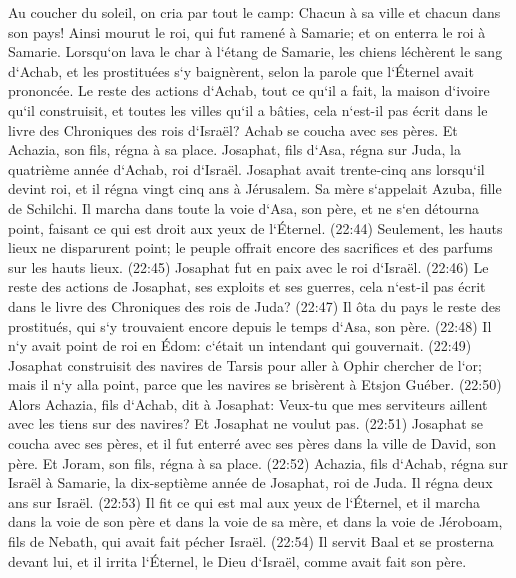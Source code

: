 \verse Au coucher du soleil, on cria par tout le camp: Chacun à sa ville et chacun dans son pays! 
\verse Ainsi mourut le roi, qui fut ramené à Samarie; et on enterra le roi à Samarie. 
\verse Lorsqu`on lava le char à l`étang de Samarie, les chiens léchèrent le sang d`Achab, et les prostituées s`y baignèrent, selon la parole que l`Éternel avait prononcée. 
\verse Le reste des actions d`Achab, tout ce qu`il a fait, la maison d`ivoire qu`il construisit, et toutes les villes qu`il a bâties, cela n`est-il pas écrit dans le livre des Chroniques des rois d`Israël? 
\verse Achab se coucha avec ses pères. Et Achazia, son fils, régna à sa place. 
\verse Josaphat, fils d`Asa, régna sur Juda, la quatrième année d`Achab, roi d`Israël. 
\verse Josaphat avait trente-cinq ans lorsqu`il devint roi, et il régna vingt cinq ans à Jérusalem. Sa mère s`appelait Azuba, fille de Schilchi. 
\verse Il marcha dans toute la voie d`Asa, son père, et ne s`en détourna point, faisant ce qui est droit aux yeux de l`Éternel. (22:44) Seulement, les hauts lieux ne disparurent point; le peuple offrait encore des sacrifices et des parfums sur les hauts lieux. 
\verse (22:45) Josaphat fut en paix avec le roi d`Israël. 
\verse (22:46) Le reste des actions de Josaphat, ses exploits et ses guerres, cela n`est-il pas écrit dans le livre des Chroniques des rois de Juda? 
\verse (22:47) Il ôta du pays le reste des prostitués, qui s`y trouvaient encore depuis le temps d`Asa, son père. 
\verse (22:48) Il n`y avait point de roi en Édom: c`était un intendant qui gouvernait. 
\verse (22:49) Josaphat construisit des navires de Tarsis pour aller à Ophir chercher de l`or; mais il n`y alla point, parce que les navires se brisèrent à Etsjon Guéber. 
\verse (22:50) Alors Achazia, fils d`Achab, dit à Josaphat: Veux-tu que mes serviteurs aillent avec les tiens sur des navires? Et Josaphat ne voulut pas. 
\verse (22:51) Josaphat se coucha avec ses pères, et il fut enterré avec ses pères dans la ville de David, son père. Et Joram, son fils, régna à sa place. 
\verse (22:52) Achazia, fils d`Achab, régna sur Israël à Samarie, la dix-septième année de Josaphat, roi de Juda. Il régna deux ans sur Israël. 
\verse (22:53) Il fit ce qui est mal aux yeux de l`Éternel, et il marcha dans la voie de son père et dans la voie de sa mère, et dans la voie de Jéroboam, fils de Nebath, qui avait fait pécher Israël. 
\verse (22:54) Il servit Baal et se prosterna devant lui, et il irrita l`Éternel, le Dieu d`Israël, comme avait fait son père. 
